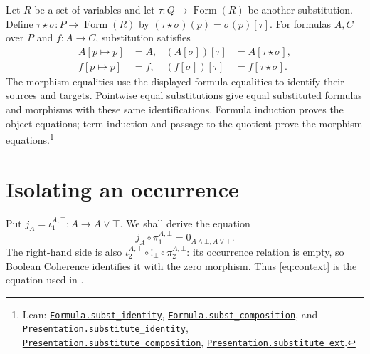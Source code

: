 \documentclass[11pt]{article}
\newcommand{\FormulaSet}{\operatorname{Form}}
\begin{document}
Let $R$ be a set of variables and let
$\tau:Q\to\FormulaSet(R)$ be another substitution. Define
$\tau\star\sigma:P\to\FormulaSet(R)$ by
$(\tau\star\sigma)(p)=\sigma(p)[\tau]$. For formulas $A,C$ over
$P$ and $f:A\to C$, substitution satisfies
\[
 \begin{aligned}
 A[p\mapsto p]&=A,&
 (A[\sigma])[\tau]&=A[\tau\star\sigma],\\
 f[p\mapsto p]&=f,&
 (f[\sigma])[\tau]&=f[\tau\star\sigma].
 \end{aligned}
\]
The morphism equalities use the displayed formula equalities to
identify their sources and targets. Pointwise equal substitutions
give equal substituted formulas and morphisms with these same
identifications. Formula induction proves the object equations;
term induction and passage to the quotient prove the morphism
equations.\footnote{\raggedright Lean:
\href{https://github.com/flengyel/Dosen-Petric-Maximality/blob/dosen-petric-v25-palomar-v3/DosenPetric/FormulaSubstitutionLaws.lean\#L11}{\texttt{Formula.\allowbreak{}subst\_identity}},
\href{https://github.com/flengyel/Dosen-Petric-Maximality/blob/dosen-petric-v25-palomar-v3/DosenPetric/FormulaSubstitutionLaws.lean\#L20}{\texttt{Formula.\allowbreak{}subst\_composition}}, and
\href{https://github.com/flengyel/Dosen-Petric-Maximality/blob/dosen-petric-v25-palomar-v3/DosenPetric/PresentationSubstitutionActionQuotient.lean\#L39}{\texttt{Presentation.\allowbreak{}substitute\_identity}},
\href{https://github.com/flengyel/Dosen-Petric-Maximality/blob/dosen-petric-v25-palomar-v3/DosenPetric/PresentationSubstitutionActionQuotient.lean\#L44}{\texttt{Presentation.\allowbreak{}substitute\_composition}},
\href{https://github.com/flengyel/Dosen-Petric-Maximality/blob/dosen-petric-v25-palomar-v3/DosenPetric/PresentationSubstitutionActionQuotient.lean\#L57}{\texttt{Presentation.\allowbreak{}substitute\_ext}}.}

\section{Isolating an occurrence}\label{sec:isolation}

Put $j_A=\iota_1^{A,\top}:A\to A\vee\top$. We shall derive the equation
\begin{equation}
 j_A\circ\pi_1^{A,\bot}
   =0_{A\wedge\bot,A\vee\top}.
 \tag{$K_A$}\label{eq:context}
\end{equation}
The right-hand side is also
$\iota_2^{A,\top}\circ!_\bot\circ\pi_2^{A,\bot}$: its occurrence
relation is empty, so Boolean Coherence identifies it with the zero
morphism. Thus \eqref{eq:context} is the equation used in
\cite[\S9.7, pp.~215--216]{DP}.
\end{document}
